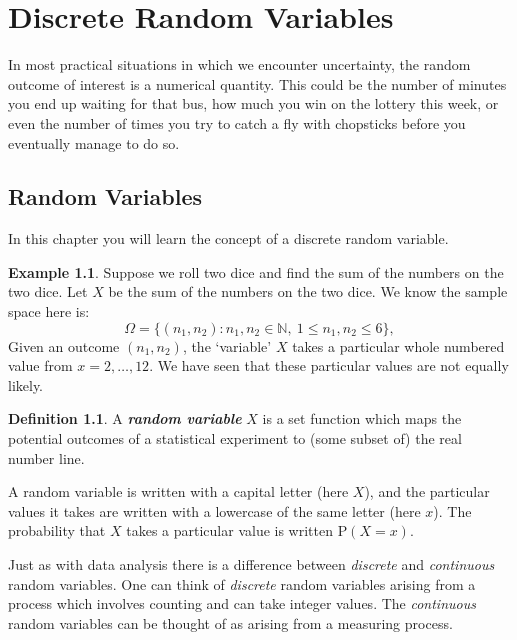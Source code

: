 \documentclass[
]{book}
\theoremstyle{definition}
\newtheorem{definition}{Definition}[chapter]
\theoremstyle{definition}
\newtheorem{example}{Example}[chapter]
\theoremstyle{definition}
\theoremstyle{definition}
\theoremstyle{remark}
\begin{document}
\hypertarget{drv}{%
\chapter{Discrete Random Variables}\label{drv}}

In most practical situations in which we encounter uncertainty, the random outcome of interest is a numerical quantity. This could be the number of minutes you end up waiting for that bus, how much you win on the lottery this week, or even the number of times you try to catch a fly with chopsticks before you eventually manage to do so.

\hypertarget{random-variables}{%
\section{Random Variables}\label{random-variables}}

In this chapter you will learn the concept of a discrete random variable.

\begin{example}
Suppose we roll two dice and find the sum of the numbers on the two dice. Let \(X\) be the sum of the numbers on the two dice. We know the sample space here is:
\[\Omega = \{ (n_1,n_2) : n_1,n_2 \in \mathbb{N}, \ 1 \leq n_1 , n_2 \leq 6 \},\]
Given an outcome \((n_1,n_2)\), the `variable' \(X\) takes a particular whole numbered value from \(x=2, \dots , 12\). We have seen that these particular values are not equally likely.
\end{example}

\begin{definition}
A \textbf{\emph{random variable}} \(X\) is a set function which maps the potential outcomes of a statistical experiment to (some subset of) the real number line.

A random variable is written with a capital letter (here \(X\)), and the particular values it takes are written with a lowercase of the same letter (here \(x\)). The probability that \(X\) takes a particular value is written \(\text{P}(X=x)\).
\end{definition}

Just as with data analysis there is a difference between \emph{discrete} and \emph{continuous} random variables. One can think of \emph{discrete} random variables arising from a process which involves counting and can take integer values. The \emph{continuous} random variables can be thought of as arising from a measuring process.
\end{document}

